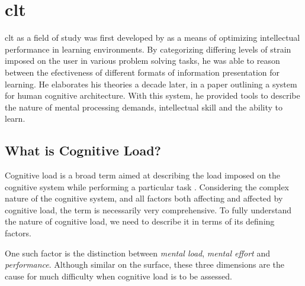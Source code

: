 \section{\acrlong{clt}} \label{sec:theory/CLT}

\acrfull{clt} as a field of study was first developed by \textcite{sweller1988} as a means of optimizing intellectual performance in learning environments. By categorizing differing levels of strain imposed on the user in various problem solving tasks, he was able to reason between the efectiveness of different formats of information presentation for learning. He elaborates his theories a decade later, in a paper outlining a system for human cognitive architecture. With this system, he provided tools to describe the nature of mental processing demands, intellectual skill and the ability to learn.



\subsection{What is Cognitive Load?}


Cognitive load is a broad term aimed at describing the load imposed on the cognitive system while performing a particular task \cite{paas1994}. Considering the complex nature of the cognitive system, and all factors both affecting and affected by cognitive load, the term is necessarily very comprehensive. To fully understand the nature of cognitive load, we need to describe it in terms of its defining factors. 

One such factor is the distinction between \textit{mental load}, \textit{mental effort} and \textit{performance}. Although similar on the surface, these three dimensions are the cause for much difficulty when cognitive load is to be assessed.

